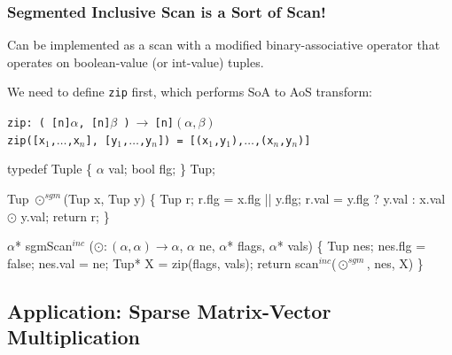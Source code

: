 \documentclass{beamer}
\renewcommand{\emph}[1]{\textcolor{CosGreen}{ #1}}
\newcommand{\emp}[1]{\textcolor{DikuRed}{ #1}}
\newcommand{\mymath}[1]{$ #1 $}
\newcommand{\myindu}[1]{^{#1}}
\begin{document}
\begin{frame}[fragile,t]
  \frametitle{Segmented Inclusive Scan is a Sort of Scan!}
\pause

Can be implemented as a scan with a modified binary-associative
operator that operates on boolean-value (or int-value) tuples. 
\bigskip

We need to define {\tt zip} first, which performs SoA to AoS transform:\\\smallskip
\begin{scriptsize}
\emp{{\tt zip: ( [n]$\alpha$, [n]$\beta$ )$~\rightarrow~$[n]$(\alpha,\beta)$}}\\
\emph{\tt zip([x$_1$,$\ldots$,x$_n$], [y$_1$,$\ldots$,y$_n$])~=~[(x$_1$,y$_1$),$\ldots$,(x$_{n}$,y$_{n}$)]}\\\medskip
\end{scriptsize}
\medskip\pause

\begin{colorcode}[fontsize=\scriptsize]
typedef Tuple \{
    \mymath{\alpha}    val;
    bool flg;
\} Tup;

Tup \mymath{\odot\myindu{sgm}}(Tup x, Tup y) \{
    Tup r;
    r.flg = x.flg || y.flg;
    r.val = y.flg ? y.val : x.val \mymath{\odot} y.val;
    return r;
\}

\mymath{\alpha}* sgmScan\mymath{\myindu{inc}} (\mymath{\odot: (\alpha,\alpha)\to\alpha}, \mymath{\alpha} ne, \mymath{\alpha}* flags, \mymath{\alpha}* vals) \{
    Tup nes; nes.flg = false; nes.val = ne;
    Tup* X = zip(flags, vals);
    return scan\mymath{\myindu{inc}}(\mymath{\odot\myindu{sgm}}, nes, X)
\}
\end{colorcode}

\end{frame}



\subsection{Application: Sparse Matrix-Vector Multiplication}
\end{document}
